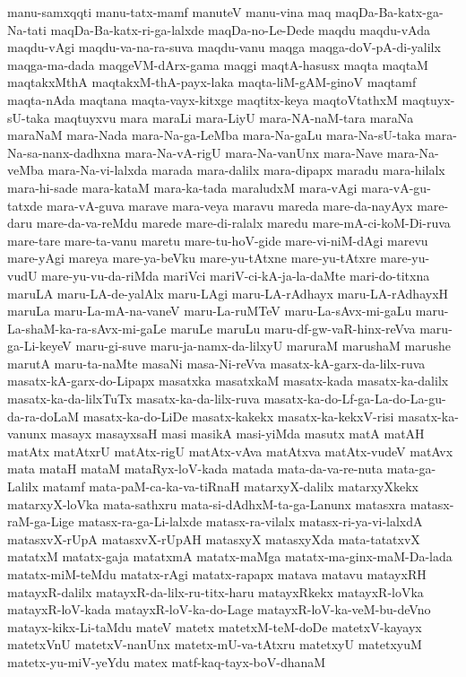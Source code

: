 {manu-samxqqti
manu-tatx-mamf
manuteV
manu-vina
maq
maqDa-Ba-katx-ga-Na-tati
maqDa-Ba-katx-ri-ga-lalxde
maqDa-no-Le-Dede
maqdu
maqdu-vAda
maqdu-vAgi
maqdu-va-na-ra-suva
maqdu-vanu
maqga
maqga-doV-pA-di-yalilx
maqga-ma-dada
maqgeVM-dArx-gama
maqgi
maqtA-hasusx
maqta
maqtaM
maqtakxMthA
maqtakxM-thA-payx-laka
maqta-liM-gAM-ginoV
maqtamf
maqta-nAda
maqtana
maqta-vayx-kitxge
maqtitx-keya
maqtoVtathxM
maqtuyx-sU-taka
maqtuyxvu
mara
maraLi
mara-LiyU
mara-NA-naM-tara
maraNa
maraNaM
mara-Nada
mara-Na-ga-LeMba
mara-Na-gaLu
mara-Na-sU-taka
mara-Na-sa-nanx-dadhxna
mara-Na-vA-rigU
mara-Na-vanUnx
mara-Nave
mara-Na-veMba
mara-Na-vi-lalxda
marada
mara-dalilx
mara-dipapx
maradu
mara-hilalx
mara-hi-sade
mara-kataM
mara-ka-tada
maraludxM
mara-vAgi
mara-vA-gu-tatxde
mara-vA-guva
marave
mara-veya
maravu
mareda
mare-da-nayAyx
mare-daru
mare-da-va-reMdu
marede
mare-di-ralalx
maredu
mare-mA-ci-koM-Di-ruva
mare-tare
mare-ta-vanu
maretu
mare-tu-hoV-gide
mare-vi-niM-dAgi
marevu
mare-yAgi
mareya
mare-ya-beVku
mare-yu-tAtxne
mare-yu-tAtxre
mare-yu-vudU
mare-yu-vu-da-riMda
mariVci
mariV-ci-kA-ja-la-daMte
mari-do-titxna
maruLA
maru-LA-de-yalAlx
maru-LAgi
maru-LA-rAdhayx
maru-LA-rAdhayxH
maruLa
maru-La-mA-na-vaneV
maru-La-ruMTeV
maru-La-sAvx-mi-gaLu
maru-La-shaM-ka-ra-sAvx-mi-gaLe
maruLe
maruLu
maru-df-gw-vaR-hinx-reVva
maru-ga-Li-keyeV
maru-gi-suve
maru-ja-namx-da-lilxyU
maruraM
marushaM
marushe
marutA
maru-ta-naMte
masaNi
masa-Ni-reVva
masatx-kA-garx-da-lilx-ruva
masatx-kA-garx-do-Lipapx
masatxka
masatxkaM
masatx-kada
masatx-ka-dalilx
masatx-ka-da-lilxTuTx
masatx-ka-da-lilx-ruva
masatx-ka-do-Lf-ga-La-do-La-gu-da-ra-doLaM
masatx-ka-do-LiDe
masatx-kakekx
masatx-ka-kekxV-risi
masatx-ka-vanunx
masayx
masayxsaH
masi
masikA
masi-yiMda
masutx
matA
matAH
matAtx
matAtxrU
matAtx-rigU
matAtx-vAva
matAtxva
matAtx-vudeV
matAvx
mata
mataH
mataM
mataRyx-loV-kada
matada
mata-da-va-re-nuta
mata-ga-Lalilx
matamf
mata-paM-ca-ka-va-tiRnaH
matarxyX-dalilx
matarxyXkekx
matarxyX-loVka
mata-sathxru
mata-si-dAdhxM-ta-ga-Lanunx
matasxra
matasx-raM-ga-Lige
matasx-ra-ga-Li-lalxde
matasx-ra-vilalx
matasx-ri-ya-vi-lalxdA
matasxvX-rUpA
matasxvX-rUpAH
matasxyX
matasxyXda
mata-tatatxvX
matatxM
matatx-gaja
matatxmA
matatx-maMga
matatx-ma-ginx-maM-Da-lada
matatx-miM-teMdu
matatx-rAgi
matatx-rapapx
matava
matavu
matayxRH
matayxR-dalilx
matayxR-da-lilx-ru-titx-haru
matayxRkekx
matayxR-loVka
matayxR-loV-kada
matayxR-loV-ka-do-Lage
matayxR-loV-ka-veM-bu-deVno
matayx-kikx-Li-taMdu
mateV
matetx
matetxM-teM-doDe
matetxV-kayayx
matetxVnU
matetxV-nanUnx
matetx-mU-va-tAtxru
matetxyU
matetxyuM
matetx-yu-miV-yeYdu
matex
matf-kaq-tayx-boV-dhanaM
}
